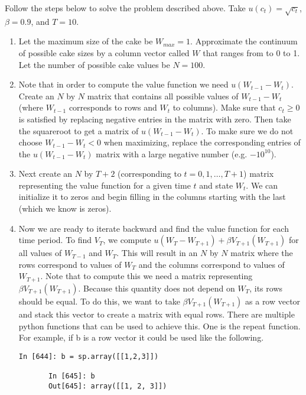 \begin{problem}  Follow the steps below to solve the problem described above.  Take $u(c_t) = \sqrt{c_t}$, $\beta = 0.9$, and $T=10$.
\begin{enumerate}
\item Let the maximum size of the cake be $W_{max} = 1$. Approximate the continuum of possible cake sizes by a column vector called $W$ that ranges from to 0 to 1.  Let the number of possible cake values be $N=100$.

   \item Note that in order to compute the value function we need $u(W_{t-1}-W_t)$.  Create an $N$ by $N$ matrix that contains all possible values of $W_{t-1} - W_t$ (where $W_{t-1}$ corresponds to rows and $W_{t}$ to columns).  Make sure that $c_t \geq 0$ is satisfied by replacing negative entries in the matrix with zero.  Then take the squareroot to get a matrix of $u(W_{t-1}-W_t)$.  To make sure we do not choose $W_{t-1} - W_t < 0$ when maximizing, replace the corresponding entries of the $u(W_{t-1}-W_t)$ matrix with a large negative number (e.g. $-10^{10}$).

   \item Next create an $N$ by $T+2$ (corresponding to $t=0,1,\ldots, T+1$) matrix representing the value function for a given time $t$ and state $W_t$.  We can initialize it to zeros and begin filling in the columns starting with the last (which we know is zeros).

   \item Now we are ready to iterate backward and find the value function for each time period.  To find $V_T$, we compute $u(W_T - W_{T+1}) + \beta V_{T+1}(W_{T+1})$ for all values of $W_{T-1}$ and $W_T$.  This will result in an $N$ by $N$ matrix where the rows correspond to values of $W_{T}$ and the columns correspond to values of $W_{T+1}$.  Note that to compute this we need a matrix representing $\beta V_{T+1}(W_{T+1})$.  Because this quantity does not depend on $W_T$, its rows should be equal.  To do this, we want to take $\beta V_{T+1}(W_{T+1})$ as a row vector and stack this vector to create a matrix with equal rows.  There are multiple python functions that can be used to achieve this.  One is the repeat function.  For example, if b is a row vector it could be used like the following.
       
       \begin{lstlisting}[style = python]
       In [644]: b = sp.array([[1,2,3]])

       In [645]: b
       Out[645]: array([[1, 2, 3]])
       

\end{lstlisting}
\end{enumerate}
\end{problem}
